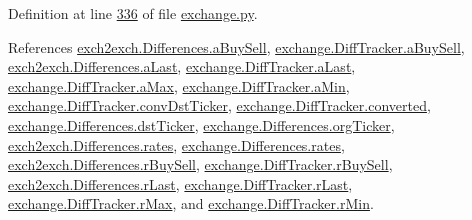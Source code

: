 Definition at line \hyperlink{exchange_8py_source_l00336}{336} of file \hyperlink{exchange_8py_source}{exchange.\+py}.



References \hyperlink{exch2exch_8py_source_l00121}{exch2exch.\+Differences.\+a\+Buy\+Sell}, \hyperlink{exchange_8py_source_l00301}{exchange.\+Diff\+Tracker.\+a\+Buy\+Sell}, \hyperlink{exch2exch_8py_source_l00124}{exch2exch.\+Differences.\+a\+Last}, \hyperlink{exchange_8py_source_l00304}{exchange.\+Diff\+Tracker.\+a\+Last}, \hyperlink{exchange_8py_source_l00295}{exchange.\+Diff\+Tracker.\+a\+Max}, \hyperlink{exchange_8py_source_l00296}{exchange.\+Diff\+Tracker.\+a\+Min}, \hyperlink{exchange_8py_source_l00293}{exchange.\+Diff\+Tracker.\+conv\+Dst\+Ticker}, \hyperlink{exchange_8py_source_l00291}{exchange.\+Diff\+Tracker.\+converted}, \hyperlink{exchange_8py_source_l00265}{exchange.\+Differences.\+dst\+Ticker}, \hyperlink{exchange_8py_source_l00266}{exchange.\+Differences.\+org\+Ticker}, \hyperlink{exch2exch_8py_source_l00107}{exch2exch.\+Differences.\+rates}, \hyperlink{exchange_8py_source_l00264}{exchange.\+Differences.\+rates}, \hyperlink{exch2exch_8py_source_l00122}{exch2exch.\+Differences.\+r\+Buy\+Sell}, \hyperlink{exchange_8py_source_l00302}{exchange.\+Diff\+Tracker.\+r\+Buy\+Sell}, \hyperlink{exch2exch_8py_source_l00125}{exch2exch.\+Differences.\+r\+Last}, \hyperlink{exchange_8py_source_l00305}{exchange.\+Diff\+Tracker.\+r\+Last}, \hyperlink{exchange_8py_source_l00299}{exchange.\+Diff\+Tracker.\+r\+Max}, and \hyperlink{exchange_8py_source_l00298}{exchange.\+Diff\+Tracker.\+r\+Min}.


